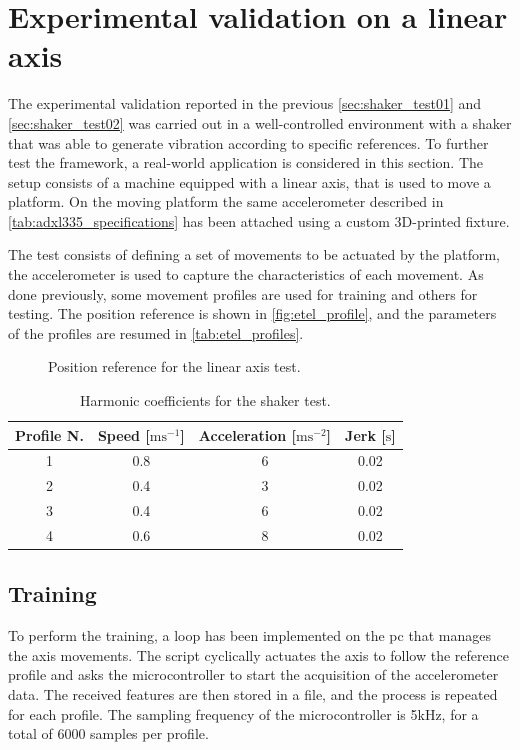 \clearpage
\section{Experimental validation on a linear axis}
\label{sec:ExperimentalValidation}

The experimental validation reported in the previous \autoref{sec:shaker_test01} and \autoref{sec:shaker_test02} was carried out in a well-controlled environment with a shaker that was able to generate vibration according to specific references. To further test the framework, a real-world application is considered in this section. The setup consists of a machine equipped with a linear axis, that is used to move a platform. On the moving platform the same accelerometer described in \autoref{tab:adxl335_specifications} has been attached using a custom 3D-printed fixture.

The test consists of defining a set of movements to be actuated by the platform, the accelerometer is used to capture the characteristics of each movement. As done previously, some movement profiles are used for training and others for testing. The position reference is shown in \autoref{fig:etel_profile}, and the parameters of the profiles are resumed in \autoref{tab:etel_profiles}.

\begin{figure}
    \centering
    \todo%
    \caption{Position reference for the linear axis test.}
    \label{fig:etel_profile}
\end{figure}

\begin{table}
    \centering
    \caption{Harmonic coefficients for the shaker test.}
    \label{tab:etel_profiles}
    \begin{tabular}{cccc} 
    \toprule
    \textbf{Profile N.} & \textbf{Speed} {[}$\text{m}\text{s}^{-1}$] & \textbf{Acceleration} {[}$\text{m}\text{s}^{-2}$] & \textbf{Jerk} {[}$\text{s}$] \\ 
    \hline
    1 & 0.8 & 6 & 0.02 \\
    2 & 0.4 & 3 & 0.02 \\
    3 & 0.4 & 6 & 0.02 \\
    4 & 0.6 & 8 & 0.02 \\
    \bottomrule
\end{tabular}
\end{table}

\subsection{Training}
To perform the training, a loop has been implemented on the \gls{pc} that manages the axis movements. The script cyclically actuates the axis to follow the reference profile and asks the microcontroller to start the acquisition of the accelerometer data. The received features are then stored in a file, and the process is repeated for each profile. The sampling frequency of the microcontroller is 5kHz, for a total of 6000 samples per profile. 

